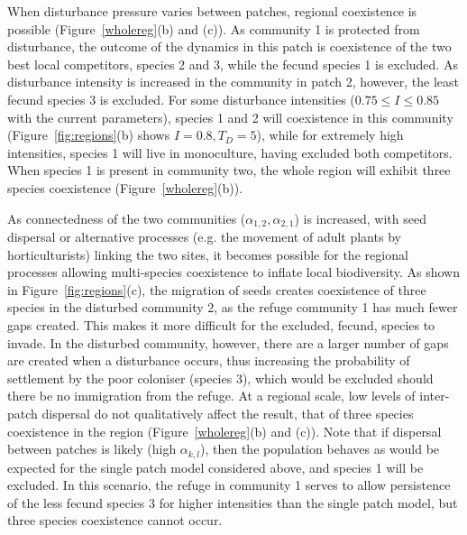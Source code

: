 When disturbance pressure varies between patches, regional coexistence is possible (Figure~\ref{wholereg}(b) and (c)). As community 1 is protected from disturbance, the outcome of the dynamics in this patch is coexistence of the two best local competitors, species 2 and 3, while the fecund species 1 is excluded. As disturbance intensity is increased in the community in patch 2, however, the least fecund species 3 is excluded. For some disturbance intensities ($0.75\leq I\leq0.85$ with the current parameters), species 1 and 2 will coexistence in this community (Figure~\ref{fig:regions}(b) shows $I=0.8, T_D=5$), while for extremely high intensities, species 1 will live in monoculture, having excluded both competitors. When species 1 is present in community two, the whole region will exhibit three species coexistence (Figure~\ref{wholereg}(b)).

As connectedness of the two communities ($\alpha_{1,2}, \alpha_{2,1}$) is increased, with seed dispersal or alternative processes (e.g. the movement of adult plants by horticulturists) linking the two sites, it becomes possible for the regional processes allowing multi-species coexistence to inflate local biodiversity. As shown in Figure~\ref{fig:regions}(c), the migration of seeds creates coexistence of three species in the disturbed community 2, as the refuge community 1 has much fewer gaps created. This makes it more difficult for the excluded, fecund, species to invade. In the disturbed community, however, there are a larger number of gaps are created when a disturbance occurs, thus increasing the probability of settlement by the poor coloniser (species 3), which would be excluded should there be no immigration from the refuge. At a regional scale, low levels of inter-patch dispersal do not qualitatively affect the result, that of three species coexistence in the region (Figure~\ref{wholereg}(b) and (c)). Note that if dispersal between patches is likely (high $\alpha_{k,l}$), then the population behaves as would be expected for the single patch model considered above, and species 1 will be excluded. In this scenario, the refuge in community 1 serves to allow persistence of the less fecund species 3 for higher intensities than the single patch model, but three species coexistence cannot occur. 

